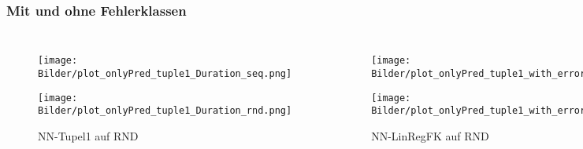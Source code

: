 \documentclass{beamer}
\begin{document}
\begin{frame}
\frametitle{Mit und ohne Fehlerklassen}
\begin{columns}
	\begin{figure}
		\texttt{[image: Bilder/plot\_onlyPred\_tuple1\_Duration\_seq.png]}\\
		\vspace*{-0.45cm}
		\caption{NN-Tupel1 auf SEQ}
		\texttt{[image: Bilder/plot\_onlyPred\_tuple1\_Duration\_rnd.png]}
		\vspace*{-0.45cm}
		\caption{NN-Tupel1 auf RND}
	\end{figure}
		\begin{figure}
		\texttt{[image: Bilder/plot\_onlyPred\_tuple1\_with\_error\_class\_from\_linreg\_Duration\_seq.png]}\\
		\vspace*{-0.45cm}
		\caption{NN-LinRegFK auf SEQ}
		\texttt{[image: Bilder/plot\_onlyPred\_tuple1\_with\_error\_class\_from\_linreg\_Duration\_rnd.png]}
		\vspace*{-0.45cm}
		\caption{NN-LinRegFK auf RND}
	\end{figure}
\end{columns}
\end{frame}
\end{document}
